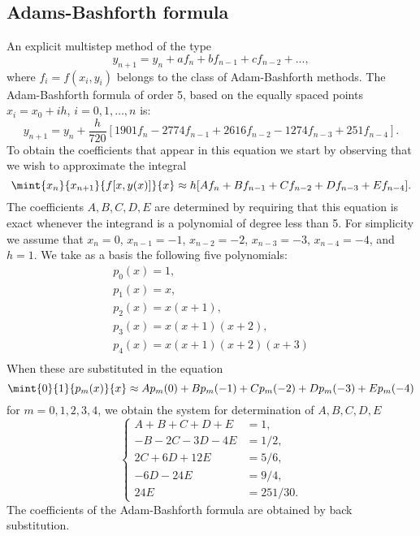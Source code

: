 \subsection{Adams-Bashforth formula}

An explicit multistep method of the type
%
\begin{equation}
  y_{n+1} = y_n + a f_n + b f_{n-1} + c f_{n-2} +...,\label{adams}
\end{equation}
%
where $f_i=f(x_i,y_i)$ belongs to the class of Adam-Bashforth methods.
The Adam-Bashforth formula of order 5, based on the equally spaced
points $x_i = x_0 + i h$, $i=0,1,\ldots,n$ is:
%
\begin{equation}
  y_{n+1} = y_n + \frac{h}{720} [ 1901 f_n - 2774 f_{n-1} +
  2616 f_{n-2} - 1274 f_{n-3} + 251 f_{n-4}].\label{pred}
\end{equation}
%
To obtain the coefficients that appear in this equation we start by
observing that we wish to approximate the integral
%
\begin{equation}
  \mint{x_n}{x_{n+1}}{f[x,y(x)]}{x} \approx h [A f_n + B f_{n-1} +
  C f_{n-2} + D f_{n-3} + E f_{n-4}].
  \label{IVP.eq:26}
\end{equation}
The coefficients $A,B,C,D,E$ are determined by requiring that this
equation is exact whenever the integrand is a polynomial of degree
less than 5. For simplicity we assume that $x_n=0$, $x_{n-1}=-1$,
$x_{n-2}=-2$, $x_{n-3}=-3$, $x_{n-4}=-4$, and $h=1$. We take as a
basis the following five polynomials:
%
\begin{equation}
  \begin{array}{l}
    p_0(x)=1, \\ p_1(x)=x, \\
    p_2(x)=x(x+1), \\ p_3(x)=x(x+1)(x+2), \\
    p_4(x)=x(x+1)(x+2)(x+3) \\
  \end{array}
  \label{IVP.eq:27}
\end{equation}
%
When these are substituted in the equation
%
\begin{equation}
  \mint{0}{1}{p_m(x)}{x} \approx A p_m(0)+B p_m(-1)+C p_m(-2)+D p_m(-3)+E p_m(-4)
  \label{IVP.eq:28}
\end{equation}
%
for $m=0,1,2,3,4$, we obtain the system for determination of
$A,B,C,D,E$
%
\begin{equation}
  \left\{
    \begin{aligned}
      A + B + C + D + E & = 1,\\
      -B - 2C - 3D - 4E & = 1/2,\\
      2C + 6D + 12E     & = 5/6,\\
      -6D - 24E         & = 9/4,\\
      24E                & = 251/30.
    \end{aligned} \right .
  \label{IVP.eq:29}
\end{equation}
%
The coefficients of the Adam-Bashforth formula are obtained by back
substitution.

